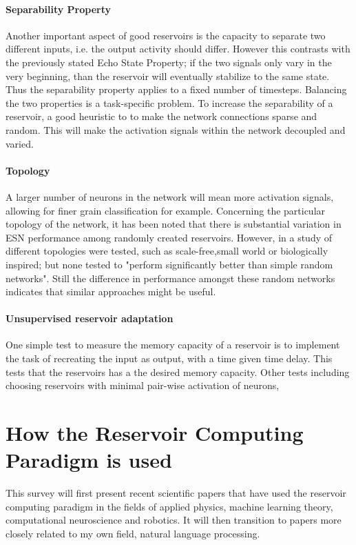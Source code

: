 \documentclass[12pt,oneside]{CUNY_CS_PhD}
\begin{document}
\subsubsection{Separability Property}
Another important aspect of good reservoirs is the capacity to separate two different inputs, i.e. the output activity should differ. However this contrasts with the previously stated Echo State Property; if the two signals only vary in the very beginning, than the reservoir will eventually stabilize to the same state. Thus the separability property applies to a fixed number of timesteps. Balancing the two properties is a task-specific problem. To increase the separability of a reservoir, a good heuristic to to make the network connections sparse and random. This will  make the activation signals within the network decoupled and varied.

\subsubsection{Topology}
A larger number of neurons in the network will mean more activation signals, allowing for finer grain classification for example. Concerning the particular topology of the network, it has been noted that there is substantial variation in ESN performance among randomly created reservoirs. However, in a study of different topologies were tested, such as scale-free,small world or biologically inspired; but none tested to "perform significantly better than simple random networks". Still the difference in performance amongst these random networks indicates that similar approaches might be useful.

\subsubsection{Unsupervised reservoir adaptation}
One simple test to measure the memory capacity of a reservoir is to implement the task of recreating the input as output, with a time given time delay. This tests that the reservoirs has a  the desired memory capacity. Other tests including choosing reservoirs with minimal pair-wise activation of neurons, 


\chapter{How the Reservoir Computing Paradigm is used}
This survey will first present recent scientific papers that have used the reservoir computing paradigm in the fields of applied physics, machine learning theory, computational neuroscience and robotics. It will then transition to papers more closely related to my own field, natural language processing.
\end{document}

